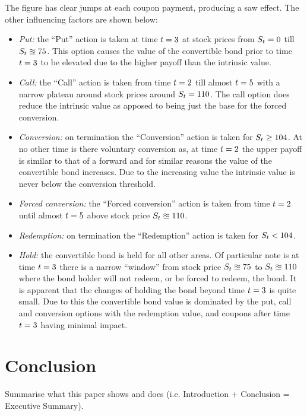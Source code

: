\documentclass[a4paper,11pt,oneside]{report}
\theoremstyle{plain}
\theoremstyle{definition}
\begin{document}
The figure has clear jumps at each coupon payment, producing a saw effect.  The other influencing factors are shown below:
\begin{itemize}
 \item \emph{Put:} the ``Put'' action is taken at time $\t = 3$ at stock prices from $\S = 0$ till $\S \approxeq 75$.  This option causes the value of the convertible bond prior to time $\t = 3$ to be elevated due to the higher payoff than the intrinsic value.
 \item \emph{Call:} the ``Call'' action is taken from time $\t = 2$ till almost $\t = 5$ with a narrow plateau around stock prices around $\S = 110$.  The call option does reduce the intrinsic value as apposed to being just the base for the forced conversion.
 \item \emph{Conversion:} on termination the ``Conversion'' action is taken for $\S \ge 104$.  At no other time is there voluntary conversion as, at time $\t = 2$ the upper payoff is similar to that of a forward and for similar reasons the value of the convertible bond increases.  Due to the increasing value the intrinsic value is never below the conversion threshold.
 \item \emph{Forced conversion:} the ``Forced conversion'' action is taken from time $\t = 2$ until almost $\t = 5$ above stock price $\S \approxeq 110$.
 \item \emph{Redemption:} on termination the ``Redemption'' action is taken for $\S < 104$.
 \item \emph{Hold:} the convertible bond is held for all other areas.  Of particular note is at time $\t = 3$ there is a narrow ``window'' from stock price $\S \approxeq 75$ to $\S \approxeq 110$ where the bond holder will not redeem, or be forced to redeem, the bond.  It is apparent that the changes of holding the bond beyond time $\t = 3$ is quite small.  Due to this the convertible bond value is dominated by the put, call and conversion options with the redemption value, and coupons after time $\t = 3$ having minimal impact.
\end{itemize}



\chapter{Conclusion}
Summarise what this paper shows and does (i.e. Introduction + Conclusion = Executive Summary).
\end{document}
